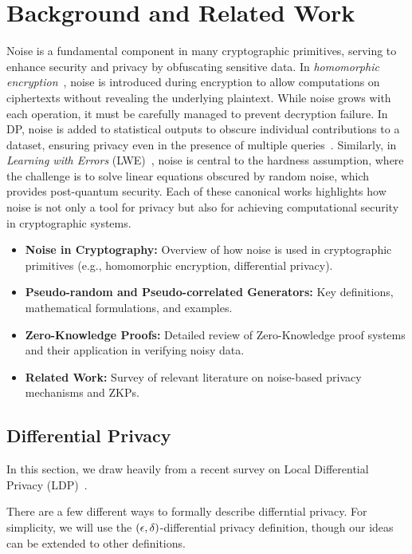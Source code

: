 \documentclass[11pt]{article}
\begin{document}
\section{Background and Related Work}

Noise is a fundamental component in many cryptographic primitives, serving to enhance security and privacy by obfuscating sensitive data. 
In \emph{homomorphic encryption}~\cite{gentry2009fully}, noise is introduced during encryption to allow computations on ciphertexts without revealing the underlying plaintext. 
While noise grows with each operation, it must be carefully managed to prevent decryption failure. 
In DP, noise is added to statistical outputs to obscure individual contributions to a dataset, ensuring privacy even in the presence of multiple queries~\cite{dwork2006differential}. 
Similarly, in \emph{Learning with Errors} (LWE)~\cite{regev2009lattices}, noise is central to the hardness assumption, where the challenge is to solve linear equations obscured by random noise, which provides post-quantum security.
Each of these canonical works highlights how noise is not only a tool for privacy but also for achieving computational security in cryptographic systems.
\begin{itemize}
    \item \textbf{Noise in Cryptography:} Overview of how noise is used in cryptographic primitives (e.g., homomorphic encryption, differential privacy).
    \item \textbf{Pseudo-random and Pseudo-correlated Generators:} Key definitions, mathematical formulations, and examples.
    \item \textbf{Zero-Knowledge Proofs:} Detailed review of Zero-Knowledge proof systems and their application in verifying noisy data.
    \item \textbf{Related Work:} Survey of relevant literature on noise-based privacy mechanisms and ZKPs.
\end{itemize}

\subsection{Differential Privacy}
In this section, we draw heavily from a recent survey on Local Differential Privacy (LDP)~\cite{yang2023local}.

There are a few different ways to formally describe differntial privacy.
For simplicity, we will use the $(\epsilon, \delta)$-differential privacy definition, though our ideas can be extended to other definitions.
\end{document}
